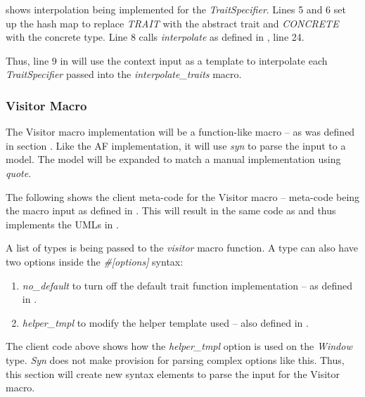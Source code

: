  shows interpolation being implemented for the \textit{TraitSpecifier}.
Lines 5 and 6 set up the hash map to replace \textit{TRAIT} with the abstract trait and \textit{CONCRETE} with the concrete type.
Line 8 calls \textit{interpolate} as defined in , line 24.

Thus, line 9 in  will use the context input as a template to interpolate each \textit{TraitSpecifier} passed into the \textit{interpolate\_traits} macro.

\subsubsection{Visitor Macro}
The Visitor macro implementation will be a function-like macro -- as was defined in section .
Like the AF implementation, it will use \textit{syn} to parse the input to a model.
The model will be expanded to match a manual implementation using \textit{quote}.

The following shows the client meta-code for the Visitor macro -- meta-code being the macro input as defined in .
This will result in the same code as  and thus implements the UMLs in .


A list of types is being passed to the \textit{visitor} macro function.
A type can also have two options inside the \textit{\#[options]} syntax:
\begin{enumerate}
	\item \textit{no\_default} to turn off the default trait function implementation -- as defined in .
	\item \textit{helper\_tmpl} to modify the helper template used -- also defined in .
\end{enumerate}

The client code above shows how the \textit{helper\_tmpl} option is used on the \textit{Window} type.
\textit{Syn} does not make provision for parsing complex options like this.
Thus, this section will create new syntax elements to parse the input for the Visitor macro.

